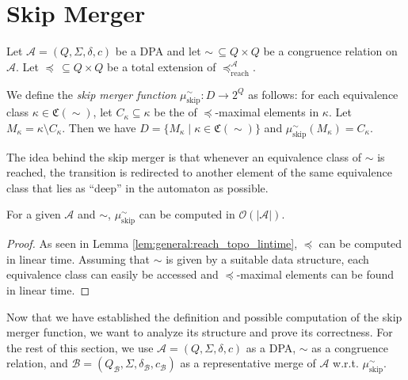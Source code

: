 
\section{Skip Merger}
\label{sect:skipper}

\begin{defn}
	Let $\mathcal{A} = (Q, \Sigma, \delta, c)$ be a DPA and let $\sim \,\subseteq Q \times Q$ be a congruence relation on $\mathcal{A}$. Let $\preceq \,\subseteq Q \times Q$ be a total extension of $\preceq_\text{reach}^\mathcal{A}$. 
	
	We define the \emph{skip merger function} $\mu_\text{skip}^\sim : D \rightarrow 2^Q$ as follows: for each equivalence class $\kappa \in \mathfrak{C}(\sim)$, let $C_\kappa \subseteq \kappa$ be the of $\preceq$-maximal elements in $\kappa$. Let $M_\kappa = \kappa \setminus C_\kappa$. Then we have $D = \{ M_\kappa \mid \kappa \in \mathfrak{C}(\sim) \}$ and $\mu_\text{skip}^\sim(M_\kappa) = C_\kappa$.
\end{defn}

The idea behind the skip merger is that whenever an equivalence class of $\sim$ is reached, the transition is redirected to another element of the same equivalence class that lies as \enquote{deep} in the automaton as possible.

\begin{lem}
\label{lem:skip:skip_aut_linear_time}
	For a given $\mathcal{A}$ and $\sim$, $\mu_\text{skip}^\sim$ can be computed in $\mathcal{O}(|\mathcal{A}|)$.
\end{lem}

\begin{proof}
	As seen in Lemma \ref{lem:general:reach_topo_lintime}, $\preceq$ can be computed in linear time. Assuming that $\sim$ is given by a suitable data structure, each equivalence class can easily be accessed and $\preceq$-maximal elements can be found in linear time.
\end{proof}

\vspace{5pt}

Now that we have established the definition and possible computation of the skip merger function, we want to analyze its structure and prove its correctness. For the rest of this section, we use $\mathcal{A} = (Q, \Sigma, \delta, c)$ as a DPA, $\sim$ as a congruence relation, and $\mathcal{B} = (Q_\mathcal{B}, \Sigma, \delta_\mathcal{B}, c_\mathcal{B})$ as a representative merge of $\mathcal{A}$ w.r.t. $\mu_\text{skip}^\sim$.

